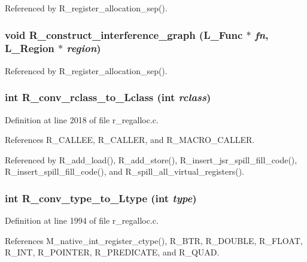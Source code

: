 Referenced by R\_\-register\_\-allocation\_\-sep().
\subsubsection{\setlength{\rightskip}{0pt plus 5cm}void R\_\-construct\_\-interference\_\-graph (L\_\-Func $\ast$ {\em fn}, L\_\-Region $\ast$ {\em region})}\label{r__regproto_8h_e1a023a27d3b5ff9abff4d5a21050423}




Referenced by R\_\-register\_\-allocation\_\-sep().
\subsubsection{\setlength{\rightskip}{0pt plus 5cm}int R\_\-conv\_\-rclass\_\-to\_\-Lclass (int {\em rclass})}\label{r__regproto_8h_529e8e448425ecb38299d72b59ba5522}




Definition at line 2018 of file r\_\-regalloc.c.

References R\_\-CALLEE, R\_\-CALLER, and R\_\-MACRO\_\-CALLER.

Referenced by R\_\-add\_\-load(), R\_\-add\_\-store(), R\_\-insert\_\-jsr\_\-spill\_\-fill\_\-code(), R\_\-insert\_\-spill\_\-fill\_\-code(), and R\_\-spill\_\-all\_\-virtual\_\-registers().
\subsubsection{\setlength{\rightskip}{0pt plus 5cm}int R\_\-conv\_\-type\_\-to\_\-Ltype (int {\em type})}\label{r__regproto_8h_145831cd48f7466e95577c28c9cee904}




Definition at line 1994 of file r\_\-regalloc.c.

References M\_\-native\_\-int\_\-register\_\-ctype(), R\_\-BTR, R\_\-DOUBLE, R\_\-FLOAT, R\_\-INT, R\_\-POINTER, R\_\-PREDICATE, and R\_\-QUAD.

